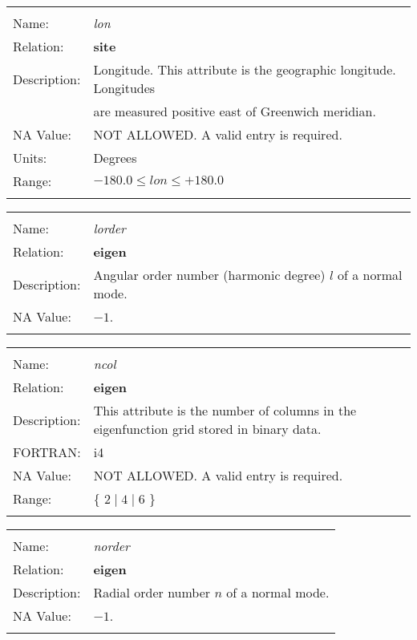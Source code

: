 \begin{tabular*}{6.5 in}{ll} \hline
\\
Name: & {\it lon} \\
Relation: & {\bf site} \\
Description: & Longitude. This attribute is the geographic longitude. Longitudes \\
& are measured positive east of Greenwich meridian. \\
NA Value: & NOT ALLOWED. A valid entry is required. \\
Units: & Degrees \\
Range: & $-180.0 \leq lon \leq +180.0$ \\
&\\
\end{tabular*}
\begin{tabular*}{6.5 in}{ll} \hline
\\
Name: & {\it lorder} \\
Relation: & {\bf eigen} \\
Description: & Angular order number (harmonic degree) $l$ of a normal mode. \\
NA Value: & $-1$. \\
&\\
\end{tabular*}
\begin{tabular*}{6.5 in}{ll} \hline
\\
Name: & {\it ncol} \\
Relation: & {\bf eigen} \\
Description: & This attribute is the number of columns in the eigenfunction grid stored in binary data. \\
FORTRAN: & i4 \\
NA Value: & NOT ALLOWED. A valid entry is required. \\
Range: & \{ $2\; |\; 4\; |\;6$ \} \\
&\\
\end{tabular*}
\begin{tabular*}{6.5 in}{ll} \hline
\\
Name: & {\it norder} \\
Relation: & {\bf eigen} \\
Description: & Radial order number $n$ of a normal mode. \\
NA Value: & $-1$. \\
&\\
\end{tabular*}

